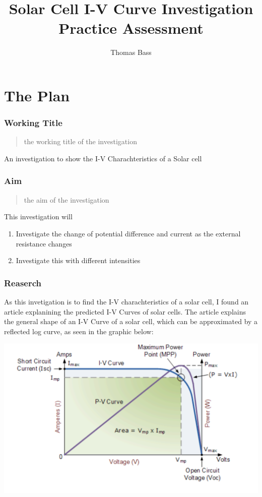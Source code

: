 \documentclass{article}
\title{Solar Cell I-V Curve Investigation \\ Practice Assessment}
\author{Thomas Bass}
\begin{document}
\maketitle


\part{The Plan}

\section{Working Title}
\begin{quote}
the working title of the investigation
\end{quote}
An investigation to show the I-V Charachteristics of a Solar cell

\section{Aim}
\begin{quote}
the aim of the investigation
\end{quote}
This investigation will
\begin{enumerate}
  \item Investigate the change of potential difference and current as the external resistance changes
  \item Investigate this with different intensities
\end{enumerate}

\section{Reaserch}
As this invetigation is to find the I-V charachteristics of a solar cell, I found an article explanining the predicted I-V Curves of solar cells. The article explains the general shape of an I-V Curve of a solar cell, which can be approximated by a reflected log curve, as seen in the graphic below:

\includegraphics[scale=0.6]{imageone}
\end{document}

